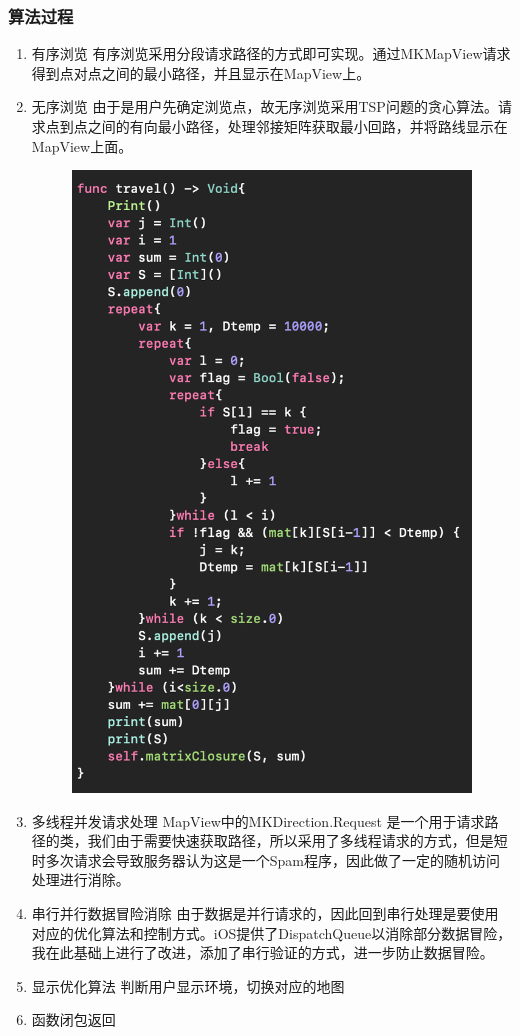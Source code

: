 \documentclass[12pt,UTF8]{ctexart}
\begin{document}
\begin{spacing}{1.4}
\subsubsection{算法过程}
\begin{enumerate}
	\item 有序浏览
有序浏览采用分段请求路径的方式即可实现。通过MKMapView请求得到点对点之间的最小路径，并且显示在MapView上。
	\item 无序浏览
由于是用户先确定浏览点，故无序浏览采用TSP问题的贪心算法。请求点到点之间的有向最小路径，处理邻接矩阵获取最小回路，并将路线显示在MapView上面。
\begin{figure}[H]
\centering
\includegraphics[width=0.4\linewidth]{fig/tsp.png}
\end{figure}
	\item 多线程并发请求处理
MapView中的MKDirection.Request 是一个用于请求路径的类，我们由于需要快速获取路径，所以采用了多线程请求的方式，但是短时多次请求会导致服务器认为这是一个Spam程序，因此做了一定的随机访问处理进行消除。
	\item 串行并行数据冒险消除
由于数据是并行请求的，因此回到串行处理是要使用对应的优化算法和控制方式。iOS提供了DispatchQueue以消除部分数据冒险，我在此基础上进行了改进，添加了串行验证的方式，进一步防止数据冒险。
	\item 显示优化算法
判断用户显示环境，切换对应的地图
	\item 函数闭包返回
\end{enumerate}


\end{spacing}
\end{document}
